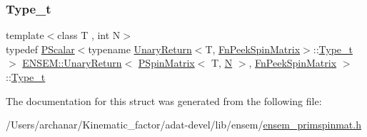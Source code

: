 \subsubsection{\texorpdfstring{Type\_t}{Type\_t}\hspace{0.1cm}{\footnotesize\ttfamily [3/3]}}
{\footnotesize\ttfamily template$<$class T , int N$>$ \\
typedef \mbox{\hyperlink{classENSEM_1_1PScalar}{P\+Scalar}}$<$typename \mbox{\hyperlink{structENSEM_1_1UnaryReturn}{Unary\+Return}}$<$T, \mbox{\hyperlink{structENSEM_1_1FnPeekSpinMatrix}{Fn\+Peek\+Spin\+Matrix}}$>$\+::\mbox{\hyperlink{structENSEM_1_1UnaryReturn_3_01PSpinMatrix_3_01T_00_01N_01_4_00_01FnPeekSpinMatrix_01_4_a1a718fe587d03e5619b75af54e2a19a3}{Type\+\_\+t}}$>$ \mbox{\hyperlink{structENSEM_1_1UnaryReturn}{E\+N\+S\+E\+M\+::\+Unary\+Return}}$<$ \mbox{\hyperlink{classENSEM_1_1PSpinMatrix}{P\+Spin\+Matrix}}$<$ T, \mbox{\hyperlink{adat__devel_2lib_2hadron_2operator__name__util_8cc_a7722c8ecbb62d99aee7ce68b1752f337}{N}} $>$, \mbox{\hyperlink{structENSEM_1_1FnPeekSpinMatrix}{Fn\+Peek\+Spin\+Matrix}} $>$\+::\mbox{\hyperlink{structENSEM_1_1UnaryReturn_3_01PSpinMatrix_3_01T_00_01N_01_4_00_01FnPeekSpinMatrix_01_4_a1a718fe587d03e5619b75af54e2a19a3}{Type\+\_\+t}}}



The documentation for this struct was generated from the following file\+:\begin{DoxyCompactItemize}
\item 
/\+Users/archanar/\+Kinematic\+\_\+factor/adat-\/devel/lib/ensem/\mbox{\hyperlink{adat-devel_2lib_2ensem_2ensem__primspinmat_8h}{ensem\+\_\+primspinmat.\+h}}\end{DoxyCompactItemize}
